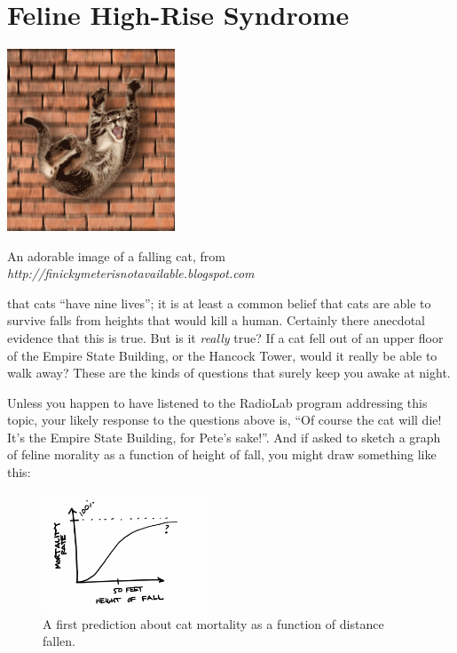 


\chapter{Feline High-Rise Syndrome}


\begin{marginfigure}
\includegraphics[width=5cm]{figs/CatFall}
\caption{An adorable image of a falling cat, from {\em{http://finickymeterisnotavailable.blogspot.com}}}
\end{marginfigure}

 that cats ``have nine lives''; it is at least a common belief that cats are able to survive falls 
from heights that would kill a human.  Certainly there anecdotal evidence that this is true.
But is it {\it really} true?  If a cat fell out of an upper floor of the Empire State Building, or the Hancock Tower, would it really be able to walk away?  These are the kinds of questions that surely keep you awake at night.


Unless you happen to have listened to the RadioLab program addressing this topic, your likely response to the questions above is, ``Of course the cat will die!  It's the Empire State Building, for Pete's sake!''.  And if asked to sketch a graph of feline morality as a function of height of fall, you might draw something like this:

\begin{figure}[h!]
\centerline{\includegraphics[height=3.5cm]{figs/InitialPrediction}}
\caption{A first prediction about cat mortality as a function of distance fallen. }
\end{figure}


